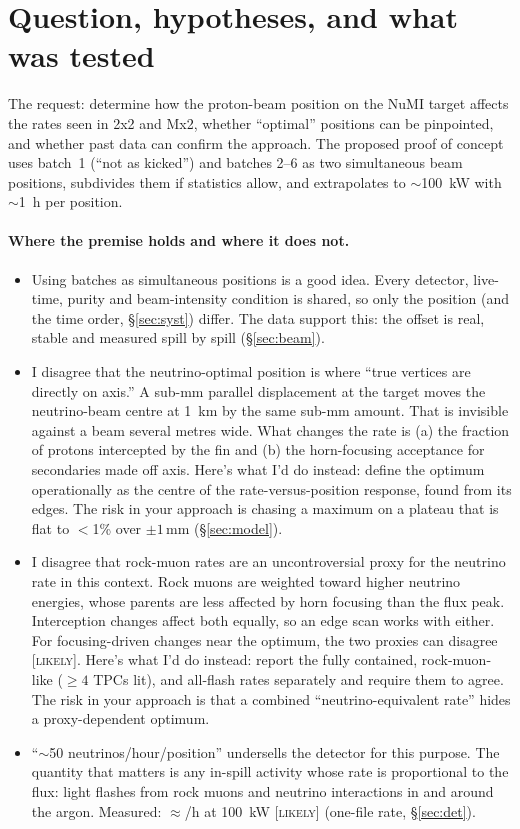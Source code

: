 \documentclass[11pt]{article}
\newcommand{\LIK}{\textsc{[likely]}}
\begin{document}
\section{Question, hypotheses, and what was tested}
The request: determine how the proton-beam position on the NuMI target affects the rates
seen in 2x2 and Mx2, whether ``optimal'' positions can be pinpointed, and whether past
data can confirm the approach. The proposed proof of concept uses batch~1 (``not as
kicked'') and batches 2--6 as two simultaneous beam positions, subdivides them if
statistics allow, and extrapolates to $\sim$\SI{100}{kW} with $\sim$\SI{1}{h} per position.

\paragraph{Where the premise holds and where it does not.}
\begin{itemize}
\item Using batches as simultaneous positions is a good idea. Every detector, live-time,
purity and beam-intensity condition is shared, so only the position (and the time order,
\S\ref{sec:syst}) differ. The data support this: the offset is real, stable and
measured spill by spill (\S\ref{sec:beam}).
\item I disagree that the neutrino-optimal position is where ``true vertices are directly on
axis.'' A sub-mm parallel displacement at the target moves the neutrino-beam centre at
\SI{1}{km} by the same sub-mm amount. That is invisible against a beam several metres
wide. What changes the rate is (a) the fraction of protons intercepted by the fin and
(b) the horn-focusing acceptance for secondaries made off axis.
Here's what I'd do instead: define the optimum operationally as the centre of the
rate-versus-position response, found from its edges.
The risk in your approach is chasing a maximum on a plateau that is flat to
$<$1\% over $\pm1$\,mm (\S\ref{sec:model}).
\item I disagree that rock-muon rates are an uncontroversial proxy for the neutrino rate in
this context. Rock muons are weighted toward higher neutrino energies, whose parents are
less affected by horn focusing than the flux peak. Interception changes affect both
equally, so an edge scan works with either. For focusing-driven changes near the
optimum, the two proxies can disagree \LIK.
Here's what I'd do instead: report the fully contained, rock-muon-like ($\geq4$ TPCs lit),
and all-flash rates separately and require them to agree.
The risk in your approach is that a combined ``neutrino-equivalent rate'' hides a
proxy-dependent optimum.
\item ``$\sim$50 neutrinos/hour/position'' undersells the detector for this purpose. The
quantity that matters is any in-spill activity whose rate is proportional to the flux:
light flashes from rock muons and neutrino interactions in and around the argon. Measured:
$\approx$\FRperHourScan/h at \SI{100}{kW} \LIK{} (one-file rate, \S\ref{sec:det}).
\end{itemize}
\end{document}
